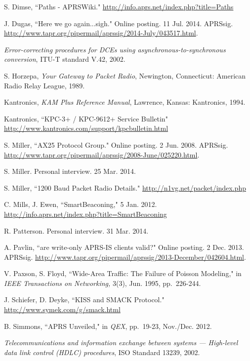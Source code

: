 \begin{thebibliography}{99}
		S. Dimse, ``Paths - APRSWiki."
		\url{http://info.aprs.net/index.php?title=Paths}

		J. Dugas,
		``Here we go again...sigh."
		Online posting. 11 Jul. 2014. APRSsig.
		\url{http://www.tapr.org/pipermail/aprssig/2014-July/043517.html}.

		\emph{Error-correcting procedures for DCEs using 
		asynchronous-to-synchronous conversion}, ITU-T standard V.42, 2002.

		S. Horzepa,
		\emph{Your Gateway to Packet Radio},
		Newington, Connecticut: American Radio Relay League, 1989.

		Kantronics,
		\emph{KAM Plus Reference Manual},
		Lawrence, Kansas: Kantronics, 1994.

		Kantronics, ``KPC-3+ / KPC-9612+ Service Bulletin"
		\url{http://www.kantronics.com/support/kpcbulletin.html}

		S. Miller,
		``AX25 Protocol Group."
		Online posting. 2 Jun. 2008. APRSsig.
		\url{http://www.tapr.org/pipermail/aprssig/2008-June/025220.html}.

		S. Miller. Personal interview. 25 Mar. 2014.

		S. Miller,
		``1200 Baud Packet Radio Details."
		\url{http://n1vg.net/packet/index.php}

		C. Mills, J. Ewen,
		``SmartBeaconing,"
		5 Jan. 2012.
		\url{http://info.aprs.net/index.php?title=SmartBeaconing}

		R. Patterson. Personal interview. 31 Mar. 2014.

		A. Pavlin,
		``are write-only APRS-IS clients valid?"
		Online posting. 2 Dec. 2013. APRSsig.
		\url{http://www.tapr.org/pipermail/aprssig/2013-December/042604.html}.

		V. Paxson, S. Floyd,
		``Wide-Area Traffic: The Failure of Poisson Modeling," in
		\emph{IEEE Transactions on Networking,}
		3(3), Jun. 1995, pp.~226-244.

		J. Schiefer, D. Deyke,
		``KISS and SMACK Protocol."
		\url{http://www.symek.com/g/smack.html}

		B. Simmons,
		``APRS Unveiled," in \emph{QEX},
		pp.~19-23,
		Nov./Dec. 2012.

		\emph{Telecommunications and information
			exchange between systems --- High-level data link control (HDLC)
		procedures}, ISO Standard 13239, 2002.


\end{thebibliography}
